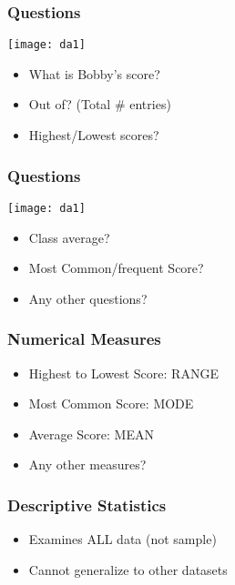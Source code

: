 \begin{frame}[fragile]\frametitle{Questions}
\begin{center}
\texttt{[image: da1]}
\end{center}
\begin{itemize}
\item What is Bobby's score?
\item Out of? (Total \# entries)
\item Highest/Lowest scores?
\end{itemize}
\end{frame}

\begin{frame}[fragile]\frametitle{Questions}
\begin{center}
\texttt{[image: da1]}
\end{center}
\begin{itemize}
\item Class average?
\item Most Common/frequent Score?
\item Any other questions?
\end{itemize}
\end{frame}

\begin{frame}[fragile]\frametitle{Numerical Measures}
\begin{itemize}
\item Highest to Lowest Score: RANGE
\item Most Common Score: MODE
\item Average Score: MEAN
\item Any other measures?
\end{itemize}
\end{frame}

\begin{frame}[fragile]\frametitle{Descriptive Statistics}
\begin{itemize}
\item Examines ALL data (not sample)
\item Cannot generalize to other datasets
\end{itemize}
\end{frame}

